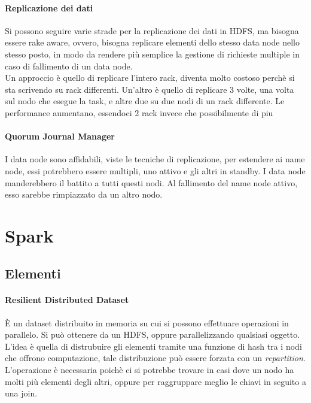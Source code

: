 \documentclass[a4paper]{article}
\begin{document}
\paragraph{Replicazione dei dati}
Si possono seguire varie strade per la replicazione dei dati in HDFS, ma bisogna 
essere rake aware, ovvero, bisogna replicare elementi dello stesso data node nello
stesso posto, in modo da rendere più semplice la gestione di richieste multiple
in caso di fallimento di un data node.\\
Un approccio è quello di replicare l'intero rack, diventa molto costoso 
perchè si sta scrivendo su rack differenti. Un'altro è quello di replicare 3 
volte, una volta sul nodo che esegue la task, e altre due su due nodi di un rack 
differente. Le performance aumentano, essendoci 2 rack invece che possibilmente
di piu 

\paragraph{Quorum Journal Manager}
I data node sono affidabili, viste le tecniche di replicazione, per estendere
ai name node, essi potrebbero essere multipli, uno attivo e gli altri in standby.
I data node manderebbero il battito a tutti questi nodi. Al fallimento del name node 
attivo, esso sarebbe rimpiazzato da un altro nodo.

\section{Spark}

\subsection{Elementi}

\paragraph{Resilient Distributed Dataset}
È un dataset distribuito in memoria su cui si possono effettuare operazioni in parallelo.
Si può ottenere da un HDFS, oppure parallelizzando qualsiasi oggetto.
L'idea è quella di distrubuire gli elementi tramite una funzione di hash tra i nodi 
che offrono computazione, tale distribuzione può essere forzata con un \emph{repartition}.
L'operazione è necessaria poichè ci si potrebbe trovare in casi dove un nodo ha molti più 
elementi degli altri, oppure per raggruppare meglio le chiavi in seguito a una join.
\end{document}
